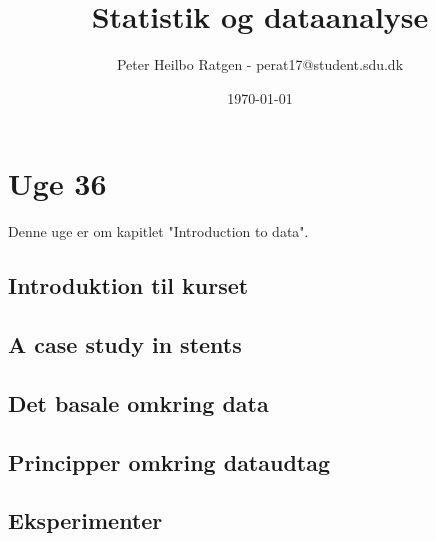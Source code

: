 \documentclass{article}
\title{Statistik og dataanalyse}
\author{Peter Heilbo Ratgen - perat17@student.sdu.dk}
\date{\today}
\begin{document}
\maketitle
\section{Uge 36}
Denne uge er om kapitlet "Introduction to data".
\subsection{Introduktion til kurset}

\subsection{A case study in stents}

\subsection{Det basale omkring data}

\subsection{Principper omkring dataudtag}

\subsection{Eksperimenter}
\end{document}
